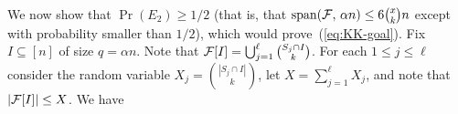 \documentclass[11pt]{article}
\makeatletter
\renewenvironment{proof}[1][\proofname]
{\par\pushQED{\qed}
	\normalfont\topsep6\p@\@plus6\p@\relax\trivlist
	\item[\hskip\labelsep\bfseries#1\@addpunct{.}]
	\ignorespaces}
{\popQED\endtrivlist\@endpefalse}
\newcommand{\FF}{{\cal F}}
\renewcommand{\wp}{\mathrm{span}}
\renewcommand{\a}{\alpha}
\newcommand{\sub}{\subseteq}
\newcommand{\Ex}{\mathbb{E}}
\makeatother
\begin{document}
\begin{proof}[Proof of Theorem~\ref{theo:sKK-UB}]
	
	We now show that $\Pr(E_2) \ge 1/2$ (that is, that $\wp(\FF,\,\a n) \le 6\binom{x}{k}n$ except with probability smaller than $1/2$), which would prove~(\ref{eq:KK-goal}). %
	Fix $I \sub [n]$ of size $q=\a n$.
	Note that $\FF[I] = \bigcup_{j=1}^\ell \binom{S_j \cap I}{k}$.
	For each $1 \le j \le \ell$ consider the random variable $X_j = \binom{|S_j \cap I|}{k}$, let $X=\sum_{j=1}^\ell X_j$, and note that $|\FF[I]| \le X$.
	We have
%	

\end{proof}
\end{document}
